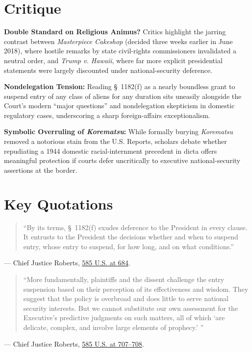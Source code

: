\documentclass[12pt]{article}
\begin{document}
\section{Critique}
\textbf{Double Standard on Religious Animus?} Critics highlight the jarring contrast between \textit{Masterpiece Cakeshop} (decided three weeks earlier in June 2018), where hostile remarks by state civil-rights commissioners invalidated a neutral order, and \textit{Trump v. Hawaii}, where far more explicit presidential statements were largely discounted under national-security deference.

\textbf{Nondelegation Tension:} Reading \S~1182(f) as a nearly boundless grant to suspend entry of any class of aliens for any duration sits uneasily alongside the Court's modern ``major questions'' and nondelegation skepticism in domestic regulatory cases, underscoring a sharp foreign-affairs exceptionalism.

\textbf{Symbolic Overruling of \textit{Korematsu}:} While formally burying \textit{Korematsu} removed a notorious stain from the U.S. Reports, scholars debate whether repudiating a 1944 domestic racial-internment precedent in dicta offers meaningful protection if courts defer uncritically to executive national-security assertions at the border.

\section{Key Quotations}
\begin{quote}
``By its terms, \S~1182(f) exudes deference to the President in every clause. It entrusts to the President the decisions whether and when to suspend entry, whose entry to suspend, for how long, and on what conditions.''
\end{quote}
\noindent --- Chief Justice Roberts, \href{https://supreme.justia.com/cases/federal/us/585/17-965/}{585 U.S. at 684}.

\begin{quote}
``More fundamentally, plaintiffs and the dissent challenge the entry suspension based on their perception of its effectiveness and wisdom. They suggest that the policy is overbroad and does little to serve national security interests. But we cannot substitute our own assessment for the Executive's predictive judgments on such matters, all of which `are delicate, complex, and involve large elements of prophecy.' ''
\end{quote}
\noindent --- Chief Justice Roberts, \href{https://www.law.cornell.edu/supremecourt/text/17-965}{585 U.S. at 707--708}.
\end{document}
